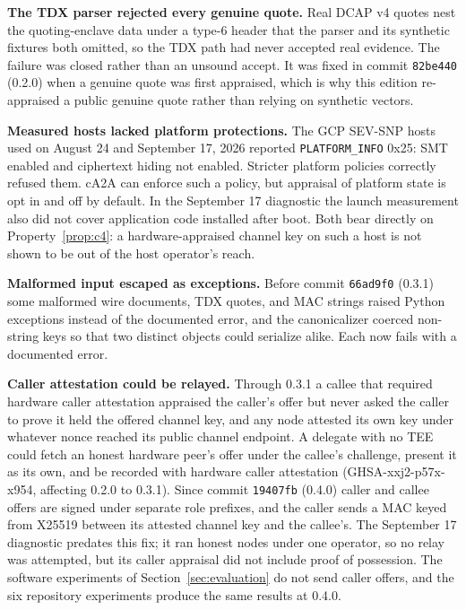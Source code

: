 \textbf{The TDX parser rejected every genuine quote.} Real DCAP v4 quotes nest the quoting-enclave
data under a type-6 header that the parser and its synthetic fixtures both omitted, so the TDX
path had never accepted real evidence. The failure was closed rather than an unsound accept. It
was fixed in commit \texttt{82be440} (0.2.0) when a genuine quote was first appraised, which is
why this edition re-appraised a public genuine quote rather than relying on synthetic vectors.

\textbf{Measured hosts lacked platform protections.} The GCP SEV-SNP hosts used on August 24 and
September 17, 2026 reported \texttt{PLATFORM\_INFO} 0x25: SMT enabled and ciphertext hiding not
enabled. Stricter platform policies correctly refused them. cA2A can enforce such a policy, but
appraisal of platform state is opt in and off by default. In the September 17 diagnostic the
launch measurement also did not cover application code installed after boot. Both bear directly
on Property~\ref{prop:c4}: a hardware-appraised channel key on such a host is not shown to be out
of the host operator's reach.

\textbf{Malformed input escaped as exceptions.} Before commit \texttt{66ad9f0} (0.3.1) some
malformed wire documents, TDX quotes, and MAC strings raised Python exceptions instead of the
documented error, and the canonicalizer coerced non-string keys so that two distinct objects could
serialize alike. Each now fails with a documented error.

\textbf{Caller attestation could be relayed.} Through 0.3.1 a callee that required hardware
caller attestation appraised the caller's offer but never asked the caller to prove it held the
offered channel key, and any node attested its own key under whatever nonce reached its public
channel endpoint. A delegate with no TEE could fetch an honest hardware peer's offer under the
callee's challenge, present it as its own, and be recorded with hardware caller attestation
(GHSA-xxj2-p57x-x954, affecting 0.2.0 to 0.3.1). Since commit \texttt{19407fb} (0.4.0) caller and
callee offers are signed under separate role prefixes, and the caller sends a MAC keyed from
X25519 between its attested channel key and the callee's. The September 17 diagnostic predates
this fix; it ran honest nodes under one operator, so no relay was attempted, but its caller
appraisal did not include proof of possession. The software experiments of
Section~\ref{sec:evaluation} do not send caller offers, and the six repository experiments
produce the same results at 0.4.0.
